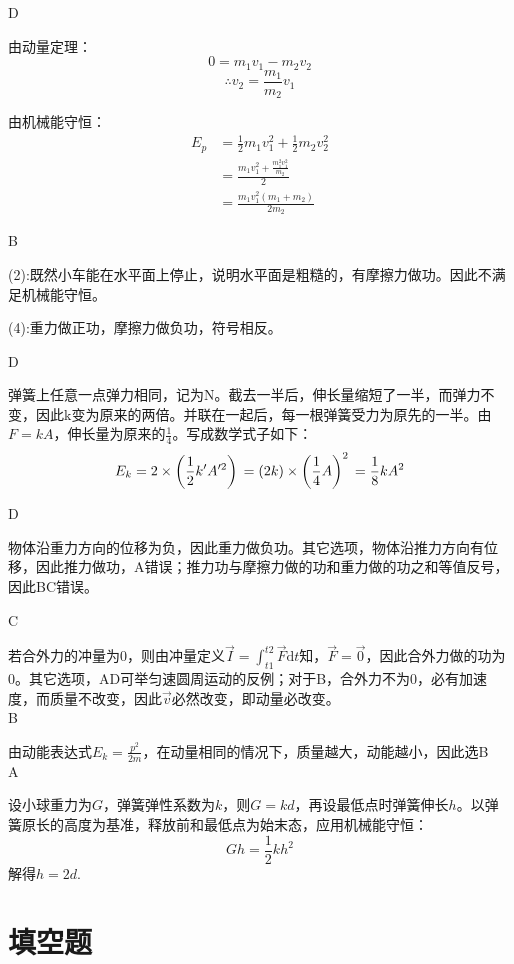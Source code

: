 \documentclass[b5paper,opensource,sourcefont,parskip]{qyxf-book}
\newcommand{\di}[1]{\mathrm{d}#1}
\begin{document}
D

\solve 由动量定理：
\[0=m_1v_1-m_2v_2\]
\[\therefore{}v_2=\frac{m_1}{m_2}v_1\]

由机械能守恒：
\begin{align*}
E_p &=\frac{1}{2}m_1v_1^2+\frac{1}{2}m_2v_2^2\\
&=\frac{m_1v_1^2+\frac{m_1^2v_1^2}{m_2}}{2}\\
&=\frac{m_1v_1^2\left(m_1+m_2\right)}{2m_2}
\end{align*}

B

\solve (2):既然小车能在水平面上停止，说明水平面是粗糙的，有摩擦力做功。因此不满足机械能守恒。

(4):重力做正功，摩擦力做负功，符号相反。

D

\solve 弹簧上任意一点弹力相同，记为N。截去一半后，伸长量缩短了一半，而弹力不变，因此k变为原来的两倍。并联在一起后，每一根弹簧受力为原先的一半。由$F=kA$，伸长量为原来的$\frac{1}{4}$。写成数学式子如下：
\[
E_k=2\times\left(\frac{1}{2}k'A'^2\right)\\=\left(2k\right)\times\left(\frac{1}{4}A\right)^2\\=\frac{1}{8}kA^2
\]

D

\solve 物体沿重力方向的位移为负，因此重力做负功。其它选项，物体沿推力方向有位移，因此推力做功，A错误；推力功与摩擦力做的功和重力做的功之和等值反号，因此BC错误。

C

\solve 若合外力的冲量为0，则由冲量定义$\vec{I}=\int_{t1}^{t2}\vec{F}\di{t}$知，$\vec{F}=\vec{0}$，因此合外力做的功为0。其它选项，AD可举匀速圆周运动的反例；对于B，合外力不为0，必有加速度，而质量不改变，因此$\vec{v}$必然改变，即动量必改变。\\

B

\solve 由动能表达式$E_k=\frac{p^2}{2m}$，在动量相同的情况下，质量越大，动能越小，因此选B\\

A

\solve 设小球重力为$G$，弹簧弹性系数为$k$，则$G=kd$，再设最低点时弹簧伸长$h$。以弹簧原长的高度为基准，释放前和最低点为始末态，应用机械能守恒：
\[Gh=\frac{1}{2}kh^2\]
解得$h=2d.$

\section{填空题}
\end{document}
